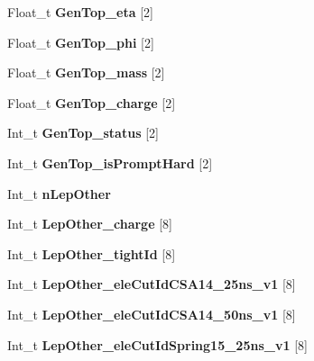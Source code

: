 \begin{DoxyCompactItemize}
Float\+\_\+t {\bfseries Gen\+Top\+\_\+eta} \mbox{[}2\mbox{]}
\item 
\hypertarget{classMiniTree_ace6376bbcf81140c0b582c09867c787d}{}\label{classMiniTree_ace6376bbcf81140c0b582c09867c787d} 
Float\+\_\+t {\bfseries Gen\+Top\+\_\+phi} \mbox{[}2\mbox{]}
\item 
\hypertarget{classMiniTree_a59be62abbed992f3166f4434bf4359bc}{}\label{classMiniTree_a59be62abbed992f3166f4434bf4359bc} 
Float\+\_\+t {\bfseries Gen\+Top\+\_\+mass} \mbox{[}2\mbox{]}
\item 
\hypertarget{classMiniTree_a1be2a7797e9518571f45459d5b16774b}{}\label{classMiniTree_a1be2a7797e9518571f45459d5b16774b} 
Float\+\_\+t {\bfseries Gen\+Top\+\_\+charge} \mbox{[}2\mbox{]}
\item 
\hypertarget{classMiniTree_a625e81f20a88f94dc54f490c96864687}{}\label{classMiniTree_a625e81f20a88f94dc54f490c96864687} 
Int\+\_\+t {\bfseries Gen\+Top\+\_\+status} \mbox{[}2\mbox{]}
\item 
\hypertarget{classMiniTree_a83367bbdcb5f69837ad0ee387b6ff8c5}{}\label{classMiniTree_a83367bbdcb5f69837ad0ee387b6ff8c5} 
Int\+\_\+t {\bfseries Gen\+Top\+\_\+is\+Prompt\+Hard} \mbox{[}2\mbox{]}
\item 
\hypertarget{classMiniTree_a01526fd837982b49d09146ebbc7dc032}{}\label{classMiniTree_a01526fd837982b49d09146ebbc7dc032} 
Int\+\_\+t {\bfseries n\+Lep\+Other}
\item 
\hypertarget{classMiniTree_a36f87243b3c7218b759ae0696146906a}{}\label{classMiniTree_a36f87243b3c7218b759ae0696146906a} 
Int\+\_\+t {\bfseries Lep\+Other\+\_\+charge} \mbox{[}8\mbox{]}
\item 
\hypertarget{classMiniTree_a5d3503514564136484d1e103d8d47c5f}{}\label{classMiniTree_a5d3503514564136484d1e103d8d47c5f} 
Int\+\_\+t {\bfseries Lep\+Other\+\_\+tight\+Id} \mbox{[}8\mbox{]}
\item 
\hypertarget{classMiniTree_ab1389a2c43eb8f3abf10b69aab810282}{}\label{classMiniTree_ab1389a2c43eb8f3abf10b69aab810282} 
Int\+\_\+t {\bfseries Lep\+Other\+\_\+ele\+Cut\+Id\+C\+S\+A14\+\_\+25ns\+\_\+v1} \mbox{[}8\mbox{]}
\item 
\hypertarget{classMiniTree_ac8b2be5096737f707beef8a225658e28}{}\label{classMiniTree_ac8b2be5096737f707beef8a225658e28} 
Int\+\_\+t {\bfseries Lep\+Other\+\_\+ele\+Cut\+Id\+C\+S\+A14\+\_\+50ns\+\_\+v1} \mbox{[}8\mbox{]}
\item 
\hypertarget{classMiniTree_afae324fa95ec66bd8dd43e1610f28b95}{}\label{classMiniTree_afae324fa95ec66bd8dd43e1610f28b95} 
Int\+\_\+t {\bfseries Lep\+Other\+\_\+ele\+Cut\+Id\+Spring15\+\_\+25ns\+\_\+v1} \mbox{[}8\mbox{]}

\end{DoxyCompactItemize}
